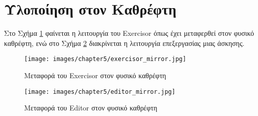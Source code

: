 \section{Υλοποίηση στον Καθρέφτη}
\label{sec:exercisor_mirror}
Στο Σχήμα \ref{fig:exercisor_mirror} φαίνεται η λειτουργία του Exercisor όπως έχει μεταφερθεί στον φυσικό καθρέφτη, ενώ στο Σχήμα \ref{fig:editor} διακρίνεται η λειτουργία επεξεργασίας μιας άσκησης.

\begin{figure}[h]
	\centering
	\texttt{[image: images/chapter5/exercisor\_mirror.jpg]}
	\caption{Μεταφορά του Exercisor στον φυσικό καθρέφτη}
	\label{fig:exercisor_mirror}
\end{figure}

\begin{figure}[H]
	\centering
	\texttt{[image: images/chapter5/editor\_mirror.jpg]}
	\caption{Μεταφορά του Editor στον φυσικό καθρέφτη}
	\label{fig:editor}
\end{figure}
